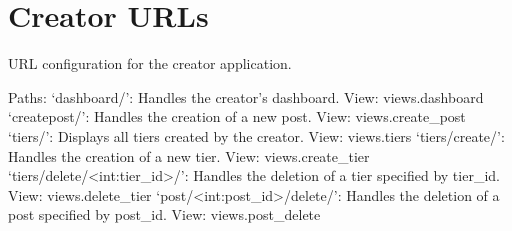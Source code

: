 \documentclass[letterpaper,10pt,english]{sphinxmanual}
\begin{document}
\begin{fulllineitems}
\end{fulllineitems}



\section{Creator URLs}
\label{\detokenize{modules/urls:module-creator.urls}}\label{\detokenize{modules/urls:creator-urls}}

\begin{fulllineitems}
\label{\detokenize{modules/urls:creator.urls.urlpatterns}}
\pysigstartsignatures
{}
\pysigstopsignatures
\sphinxAtStartPar
URL configuration for the creator application.

\sphinxAtStartPar
Paths:
\sphinxhyphen{} ‘dashboard/’: Handles the creator’s dashboard. View: views.dashboard
\sphinxhyphen{} ‘create\sphinxhyphen{}post/’: Handles the creation of a new post. View: views.create\_post
\sphinxhyphen{} ‘tiers/’: Displays all tiers created by the creator. View: views.tiers
\sphinxhyphen{} ‘tiers/create/’: Handles the creation of a new tier. View: views.create\_tier
\sphinxhyphen{} ‘tiers/delete/\textless{}int:tier\_id\textgreater{}/’: Handles the deletion of a tier specified by tier\_id. View: views.delete\_tier
\sphinxhyphen{} ‘post/\textless{}int:post\_id\textgreater{}/delete/’: Handles the deletion of a post specified by post\_id. View: views.post\_delete

\end{fulllineitems}
\end{document}
